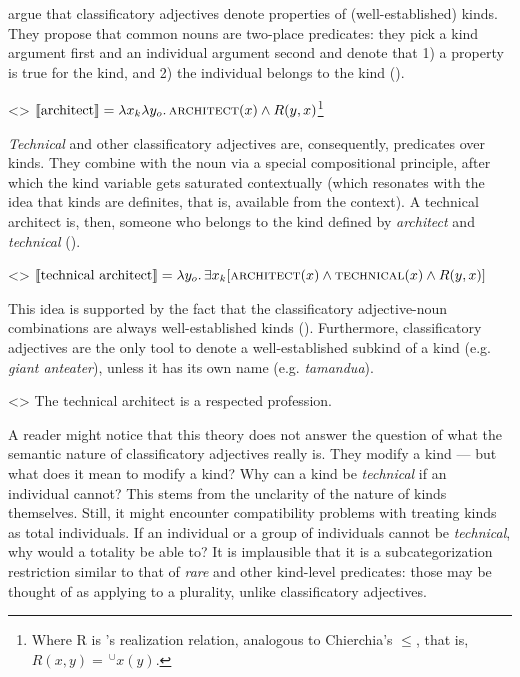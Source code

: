 \documentclass[a4paper, 12pt]{article}
\begin{document}
\textcite{mcnally2004relationaladjectivesproperties} argue that classificatory adjectives denote properties of (well-established) kinds. They propose that common nouns are two-place predicates: they pick a kind argument first and an individual argument second and denote that 1) a property is true for the kind, and 2) the individual belongs to the kind (\nextx).

\ex<>
    $\llbracket \text{architect} \rrbracket = \lambda x_k\lambda y_o.\,\textsc{architect}(x) \land R(y,x)$\footnote{Where R is \textcite{carlson1977referencekindsenglish}'s realization relation, analogous to Chierchia's $\le$, that is, $R(x,y) = \,^\cup x(y)$.}
\xe

\textit{Technical} and other classificatory adjectives are, consequently, predicates over kinds. They combine with the noun via a special compositional principle, after which the kind variable gets saturated contextually (which resonates with the idea that kinds are definites, that is, available from the context). A technical architect is, then, someone who belongs to the kind defined by \textit{architect} and \textit{technical} (\nextx).

\ex<>
    $\llbracket \text{technical architect} \rrbracket = \lambda y_o.\,\exists x_k[\textsc{architect}(x)\land\textsc{technical}(x)\land R(y,x)]$
\xe

This idea is supported by the fact that the classificatory adjective-noun combinations are always well-established kinds (\nextx). Furthermore, classificatory adjectives are the only tool to denote a well-established subkind of a kind (e.g. \textit{\emph{giant} anteater}), unless it has its own name (e.g. \textit{tamandua}).

\ex<>
    The technical architect is a respected profession.
\xe

A reader might notice that this theory does not answer the question of what the semantic nature of classificatory adjectives really is. They modify a kind --- but what does it mean to modify a kind? Why can a kind be \textit{technical} if an individual cannot? This stems from the unclarity of the nature of kinds themselves. Still, it might encounter compatibility problems with treating kinds as total individuals. If an individual or a group of individuals cannot be \textit{technical}, why would a totality be able to? It is implausible that it is a subcategorization restriction similar to that of \textit{rare} and other kind-level predicates: those may be thought of as applying to a plurality, unlike classificatory adjectives.
\end{document}
